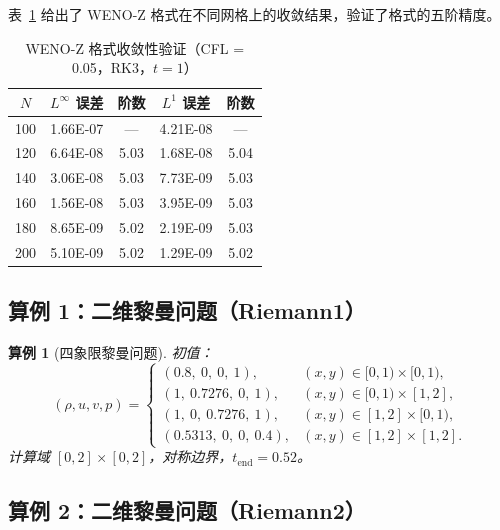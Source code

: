 \documentclass{article}
\newtheorem{example}{算例}
\numberwithin{equation}{section}
\begin{document}
表~\ref{tab:accuracy} 给出了 WENO-Z 格式在不同网格上的收敛结果，验证了格式的五阶精度。

\begin{table}[H]
\centering
\caption{WENO-Z 格式收敛性验证（CFL = 0.05，RK3，$t=1$）}
\label{tab:accuracy}
\begin{tabular}{ccccc}
\toprule
$N$ & $L^\infty$ 误差 & 阶数 & $L^1$ 误差 & 阶数 \\
\midrule
100 & 1.66E-07 & --- & 4.21E-08 & --- \\
120 & 6.64E-08 & 5.03 & 1.68E-08 & 5.04 \\
140 & 3.06E-08 & 5.03 & 7.73E-09 & 5.03 \\
160 & 1.56E-08 & 5.03 & 3.95E-09 & 5.03 \\
180 & 8.65E-09 & 5.02 & 2.19E-09 & 5.03 \\
200 & 5.10E-09 & 5.02 & 1.29E-09 & 5.02 \\
\bottomrule
\end{tabular}
\end{table}

\subsection{算例 1：二维黎曼问题（Riemann1）}

\begin{example}[四象限黎曼问题]\label{ex:riemann1}
初值\cite{fan2024}：
\begin{equation}
    (\rho, u, v, p) = \begin{cases}
        (0.8,\ 0,\ 0,\ 1),      & (x,y) \in [0,1)\times[0,1), \\
        (1,\ 0.7276,\ 0,\ 1),   & (x,y) \in [0,1)\times[1,2], \\
        (1,\ 0,\ 0.7276,\ 1),   & (x,y) \in [1,2]\times[0,1), \\
        (0.5313,\ 0,\ 0,\ 0.4), & (x,y) \in [1,2]\times[1,2].
    \end{cases}
\end{equation}
计算域 $[0,2]\times[0,2]$，对称边界，$t_{\text{end}} = 0.52$。
\end{example}

\subsection{算例 2：二维黎曼问题（Riemann2）}
\end{document}
